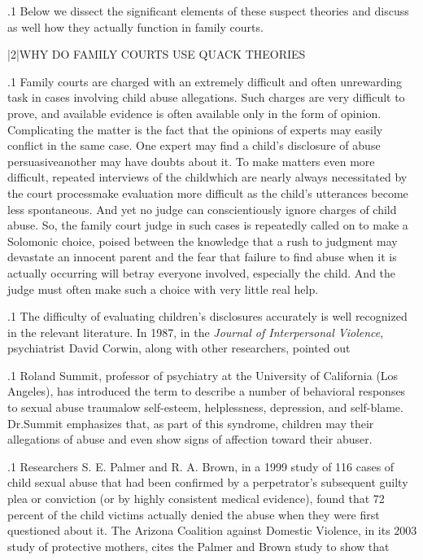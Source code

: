\documentclass[11pt, twoside]{article}
\begin{document}
{\p.1{%
Below we dissect the significant elements of these suspect theories
and discuss as well how they actually function in family courts.
}%


\s|2|{WHY DO FAMILY COURTS USE QUACK THEORIES\qm{}}

\p.1{%
\noindent{}Family courts are charged with an extremely difficult and often unrewarding task in cases involving child abuse allegations. Such charges are
very difficult to prove, and available evidence is often available only in
the form of opinion. Complicating the matter is the fact that the opinions of experts may easily conflict in the same case. One expert may
find a child’s disclosure of abuse persuasive\mdash{}another may have doubts
about it. To make matters even more difficult, repeated interviews of the
child\mdash{}which are nearly always necessitated by the court process\mdash{}make
evaluation more difficult as the child’s utterances become less spontaneous. And yet no judge can conscientiously ignore charges of child
abuse. So, the family court judge in such cases is repeatedly called on
to make a Solomonic choice, poised between the knowledge that a rush
to judgment may devastate an innocent parent and the fear that failure
to find abuse when it is actually occurring will betray everyone involved,
especially the child. And the judge must often make such a choice with
very little real help.
}%

\p.1{%
The difficulty of evaluating children’s disclosures accurately is well
recognized in the relevant literature. In 1987, in
the \textit{Journal of Interpersonal Violence}, psychiatrist David Corwin, along with other researchers,
pointed out 
}%

\p.1{%
Roland Summit, professor of psychiatry at the University of California (Los Angeles), has introduced the term  to describe a number of behavioral responses
to sexual abuse trauma\mdash{}low self-esteem, helplessness, depression, and
self-blame. Dr.\@ Summit emphasizes that, as part of this syndrome, children may  their allegations of abuse and even show signs of
affection toward their abuser.
}%

\p.1{%
Researchers S. E. Palmer and R. A. Brown, in a 1999 study of
116 cases of child sexual abuse that had been confirmed by a perpetrator’s subsequent guilty plea or conviction (or by highly consistent medical evidence), found that 72 percent of the child victims
actually denied the abuse when they were first questioned about it.
The Arizona Coalition against Domestic Violence, in its 2003 study
of protective mothers, cites the Palmer and Brown study to show
that 
}%

}
\end{document}
